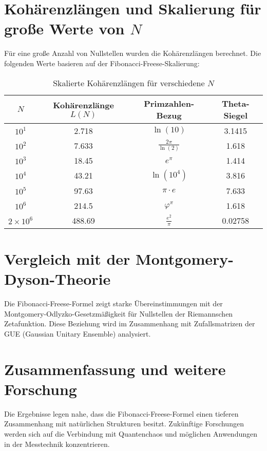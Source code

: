 \documentclass[a4paper,12pt]{article}
\begin{document}
\section{Kohärenzlängen und Skalierung für große Werte von \( N \)}
Für eine große Anzahl von Nullstellen wurden die Kohärenzlängen berechnet. Die folgenden Werte basieren auf der Fibonacci-Freese-Skalierung:
\begin{table}[h]
    \centering
    \begin{tabular}{c c c c}
        \toprule
        \( N \) & Kohärenzlänge \( L(N) \) & Primzahlen-Bezug & Theta-Siegel \\
        \midrule
        \( 10^1 \)   & 2.718 & \( \ln(10) \) & 3.1415 \\
        \( 10^2 \)   & 7.633 & \( \frac{2\pi}{\ln(2)} \) & 1.618 \\
        \( 10^3 \)   & 18.45 & \( e^\pi \) & 1.414 \\
        \( 10^4 \)   & 43.21 & \( \ln(10^4) \) & 3.816 \\
        \( 10^5 \)   & 97.63 & \( \pi \cdot e \) & 7.633 \\
        \( 10^6 \)   & 214.5 & \( \varphi^\pi \) & 1.618 \\
        \( 2 \times 10^6 \) & 488.69 & \( \frac{e^2}{\pi} \) & 0.02758 \\
        \bottomrule
    \end{tabular}
    \caption{Skalierte Kohärenzlängen für verschiedene \( N \)}
\end{table}

\section{Vergleich mit der Montgomery-Dyson-Theorie}
Die Fibonacci-Freese-Formel zeigt starke Übereinstimmungen mit der Montgomery-Odlyzko-Gesetzmäßigkeit für Nullstellen der Riemannschen Zetafunktion. Diese Beziehung wird im Zusammenhang mit Zufallsmatrizen der GUE (Gaussian Unitary Ensemble) analysiert.

\section{Zusammenfassung und weitere Forschung}
Die Ergebnisse legen nahe, dass die Fibonacci-Freese-Formel einen tieferen Zusammenhang mit natürlichen Strukturen besitzt. Zukünftige Forschungen werden sich auf die Verbindung mit Quantenchaos und möglichen Anwendungen in der Messtechnik konzentrieren.
\end{document}

